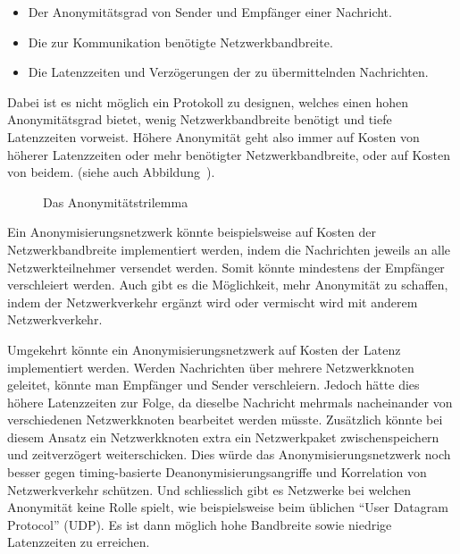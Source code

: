 \begin{itemize}
    \item Der Anonymitätsgrad von Sender und Empfänger einer Nachricht.
    \item Die zur Kommunikation benötigte Netzwerkbandbreite.
    \item Die Latenzzeiten und Verzögerungen der zu übermittelnden Nachrichten.
\end{itemize}

Dabei ist es nicht möglich ein Protokoll zu designen, welches einen hohen Anonymitätsgrad bietet, wenig Netzwerkbandbreite benötigt und tiefe Latenzzeiten vorweist. \parencite[S.~1]{das_anonymity_2018}
Höhere Anonymität geht also immer auf Kosten von höherer Latenzzeiten oder mehr benötigter Netzwerkbandbreite, oder auf Kosten von beidem.
(siehe auch Abbildung~).

\begin{figure}[H]
    \centering
    \caption{Das Anonymitätstrilemma}\label{fig:anonimitytrilemma}
\end{figure}

Ein Anonymisierungsnetzwerk könnte beispielsweise auf Kosten der Netzwerkbandbreite implementiert werden, indem die Nachrichten jeweils an alle Netzwerkteilnehmer versendet werden.
Somit könnte mindestens der Empfänger verschleiert werden.
Auch gibt es die Möglichkeit, mehr Anonymität zu schaffen, indem der Netzwerkverkehr ergänzt wird
oder vermischt wird mit anderem Netzwerkverkehr.

Umgekehrt könnte ein Anonymisierungsnetzwerk auf Kosten der Latenz implementiert werden.
Werden Nachrichten über mehrere Netzwerkknoten geleitet, könnte man Empfänger und Sender verschleiern.
Jedoch hätte dies höhere Latenzzeiten zur Folge,
da dieselbe Nachricht mehrmals nacheinander von verschiedenen Netzwerkknoten bearbeitet werden müsste.
Zusätzlich könnte bei diesem Ansatz ein Netzwerkknoten extra ein Netzwerkpaket zwischenspeichern und zeitverzögert weiterschicken.
Dies würde das Anonymisierungsnetzwerk noch besser gegen timing-basierte Deanonymisierungsangriffe und Korrelation von Netzwerkverkehr schützen.
Und schliesslich gibt es Netzwerke bei welchen Anonymität keine Rolle spielt, wie beispielsweise beim üblichen ``User Datagram Protocol'' (UDP).
Es ist dann möglich hohe Bandbreite sowie niedrige Latenzzeiten zu erreichen.

